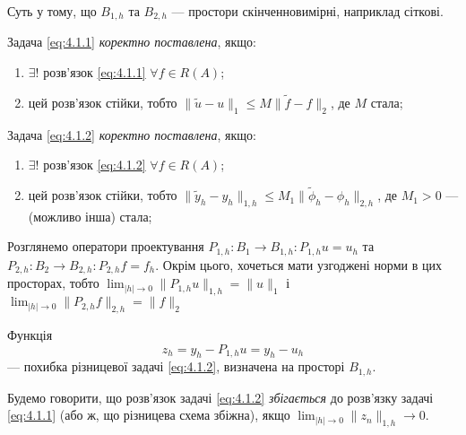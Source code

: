 Суть у тому, що $B_{1,h}$ та $B_{2,h}$ --- простори скінченновимірні, наприклад сіткові.


\begin{definition}
    Задача \eqref{eq:4.1.1} \textit{коректно поставлена}, якщо:
    \begin{enumerate}
        \item $\exists!$ розв'язок \eqref{eq:4.1.1} $\forall f \in R(A)$;
        \item цей розв'язок стійки, тобто $\|\tilde u - u\|_1 \le M \|\tilde f - f\|_2$, де $M$ стала;
    \end{enumerate}
\end{definition}

\begin{definition}
    Задача \eqref{eq:4.1.2} \textit{коректно поставлена}, якщо:
    \begin{enumerate}
        \item $\exists!$ розв'язок \eqref{eq:4.1.2} $\forall f \in R(A)$;
        \item цей розв'язок стійки, тобто $\|\tilde y_h - y_h\|_{1,h} \le M_1 \|\tilde \phi_h - \phi_h\|_{2,h}$, 
        де $M_1 > 0$ --- (можливо інша) стала;
    \end{enumerate}
\end{definition}

Розглянемо оператори проектування $P_{1, h}: B_1 \to B_{1, h}: P_{1, h} u = u_h$ та $P_{2, h}: B_2 \to B_{2, h}: P_{2, h} f = f_h$. 
Окрім цього, хочеться мати узгоджені норми в цих просторах, тобто $\lim_{|h| \to 0} \|P_{1,h} u\|_{1,h} = \|u\|_1$ і $\lim_{|h| \to 0} \|P_{2,h} f\|_{2,h} = \|f\|_2$

\begin{definition}
    Функція 
    \begin{equation}
        \label{eq:4.1.3}
        z_h = y_h - P_{1, h} u = y_h - u_h
    \end{equation}
     --- похибка різницевої задачі \eqref{eq:4.1.2}, визначена на просторі $B_{1,h}$.
\end{definition}

\begin{definition}
    Будемо говорити, що розв'язок задачі \eqref{eq:4.1.2} \textit{збігається} до розв'язку задачі \eqref{eq:4.1.1} (або ж, що різницева схема збіжна), якщо $\lim_{|h| \to 0} \|z_n\|_{1,h} \to 0$.
\end{definition}

